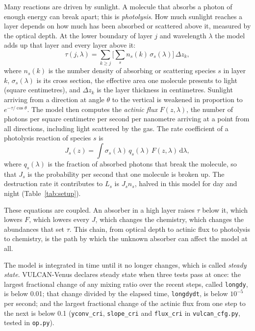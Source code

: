 Many reactions are driven by sunlight. A molecule that absorbs a photon of enough
energy can break apart; this is \emph{photolysis}. How much sunlight reaches a layer
depends on how much has been absorbed or scattered above it, measured by the optical
depth. At the lower boundary of layer $j$ and wavelength $\lambda$ the model adds up
that layer and every layer above it:
\begin{equation}
  \tau(j,\lambda) = \sum_{k \ge j} \Big[ \sum_{s} n_s(k)\,\sigma_s(\lambda) \Big]\,
  \Delta z_k ,
  \label{eq:tau}
\end{equation}
where $n_s(k)$ is the number density of absorbing or scattering species $s$ in layer
$k$, $\sigma_s(\lambda)$ is its cross section, the effective area one molecule presents
to light (square centimetres), and $\Delta z_k$ is the layer thickness in centimetres.
Sunlight arriving from a direction at angle $\theta$ to the vertical is weakened in
proportion to $e^{-\tau/\cos\theta}$. The model then computes the \emph{actinic flux}
$F(z,\lambda)$, the number of photons per square centimetre per second per nanometre
arriving at a point from all directions, including light scattered by the gas. The rate
coefficient of a photolysis reaction of species $s$ is
\begin{equation}
  J_s(z) = \int \sigma_s(\lambda)\, q_s(\lambda)\, F(z,\lambda)\, \mathrm{d}\lambda ,
  \label{eq:J}
\end{equation}
where $q_s(\lambda)$ is the fraction of absorbed photons that break the molecule, so that
$J_s$ is the probability per second that one molecule is broken up. The destruction rate
it contributes to $L_s$ is $J_s n_s$, halved in this model for day and night
(Table~\ref{tab:setup}).

These equations are coupled. An absorber in a high layer raises $\tau$ below it, which
lowers $F$, which lowers every $J$, which changes the chemistry, which changes the
abundances that set $\tau$. This chain, from optical depth to actinic flux to photolysis
to chemistry, is the path by which the unknown absorber can affect the model at all.

The model is integrated in time until it no longer changes, which is called
\emph{steady state}. VULCAN-Venus declares steady state when three tests pass at once:
the largest fractional change of any mixing ratio over the recent steps, called
\texttt{longdy}, is below 0.01; that change divided by the elapsed time,
\texttt{longdydt}, is below $10^{-5}$ per second; and the largest fractional change of
the actinic flux from one step to the next is below 0.1 (\texttt{yconv\_cri},
\texttt{slope\_cri} and \texttt{flux\_cri} in \texttt{vulcan\_cfg.py}, tested in
\texttt{op.py}).


